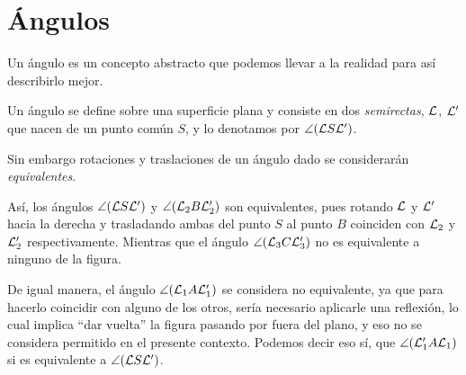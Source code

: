 
\section{Ángulos}



Un ángulo es un concepto abstracto que podemos llevar a la realidad para así describirlo mejor.

Un ángulo se define sobre una superficie plana y consiste en dos \emph{semirectas}, $\mathcal{L}$, $\mathcal{L}'$ que nacen de un punto común $S$, y lo denotamos por $\angle(\mathcal{L} S\mathcal{L}')$.

\begin{center}
\end{center}

Sin embargo rotaciones y traslaciones de un ángulo dado se considerarán \emph{equivalentes}.

Así, los ángulos $\angle(\mathcal{L} S \mathcal{L}')$ y $\angle(\mathcal{L}_2 B\mathcal{L}_2')$ son equivalentes, pues rotando $\mathcal{L}$ y $\mathcal{L}'$ hacia la derecha y trasladando ambas del punto $S$ al punto $B$ coinciden con $\mathcal{L}_2$ y $\mathcal{L}_2'$ respectivamente.
Mientras que  el ángulo $\angle(\mathcal{L}_3 C\mathcal{L}_3')$ no es equivalente a ninguno de la figura.

De igual manera, el ángulo $\angle(\mathcal{L}_1 A\mathcal{L}_1')$ se considera no equivalente, ya que para hacerlo coincidir con alguno de los otros, sería necesario aplicarle una reflexión, lo cual implica ``dar vuelta'' la figura pasando por fuera del plano, y eso no se considera permitido en el presente contexto.
Podemos decir eso sí, que $\angle(\mathcal{L}_1' A\mathcal{L}_1)$ si es equivalente a $\angle(\mathcal{L} S \mathcal{L}')$.

